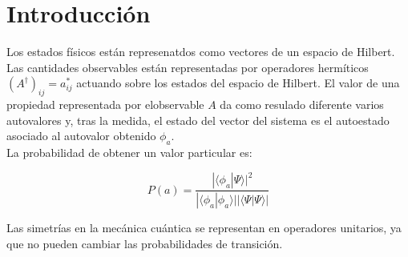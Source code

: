 \chapter{Introducción}

Los estados físicos están represenatdos como vectores de un espacio de Hilbert. Las cantidades observables están representadas por operadores hermíticos $(A^{\dagger})_{ij} = a_{ij}^*$ actuando sobre los estados del espacio de Hilbert. El valor de una propiedad representada por elobservable $A$ da como resulado diferente varios autovalores y, tras la medida, el estado del vector del sistema es el autoestado asociado al autovalor obtenido $\phi_a$. \\

La probabilidad de obtener un valor particular es:

\begin{equation}
    P(a)= \frac{|\langle \phi_a | \Psi \rangle |^2}{|\langle \phi_a | \phi_a \rangle ||\langle \Psi | \Psi \rangle |}
\end{equation}

Las simetrías en la mecánica cuántica se representan en operadores unitarios, ya que no pueden cambiar las probabilidades de transición.       